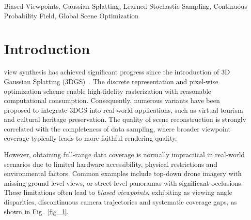 \documentclass[lettersize,journal]{IEEEtran}
\begin{document}
\begin{abstract}
{The target is instantiated by a Continuous Probability Field (CPF), a continuous, globally aggregated probability field that serves as a data-adaptive consistency prior and provides explicit global-consistency regularization for Gaussian relocation and reshaping. The CPF estimates a smooth and multi-view consistent field from global aggregation and observation-gated updates, thus providing less biased regularization and effectively suppressing view-specific overfitting artifacts.
We further leverage a bias-aware random viewpoint batch training strategy to reduce the optimization bias of view-dependent gradients by jointly optimizing uncorrelated viewpoints. 
}
Extensive experiments on three representative biased viewpoint scenarios show that GS-LSS consistently outperforms state-of-the-art Gaussian Splatting baselines, particularly under severe sampling bias.
\end{abstract}

\begin{IEEEkeywords}
Biased Viewpoints, Gaussian Splatting, 
Learned Stochastic Sampling, 
Continuous Probability Field, 
Global Scene Optimization
\end{IEEEkeywords}

\section{Introduction}

 view synthesis has achieved significant progress since the introduction of 3D Gaussian Splatting (3DGS)~\cite{3dgs}. The discrete representation and pixel-wise optimization scheme enable high-fidelity rasterization with reasonable computational consumption. Consequently, numerous variants have been proposed to integrate 3DGS into real-world applications, such as virtual tourism and cultural heritage preservation. 
The quality of scene reconstruction is strongly correlated with the completeness of data sampling, where broader viewpoint coverage typically leads to more faithful rendering quality.

However, obtaining full-range data coverage is normally impractical in real-world scenarios due to limited hardware accessibility, physical restrictions and environmental factors. Common examples include top-down drone imagery with missing ground-level views, or street-level panoramas with significant occlusions. 
These limitations often lead to \emph{biased viewpoints}, exhibiting as viewing angle disparities, discontinuous camera trajectories and systematic coverage gaps, as shown in Fig.~\ref{fig_1}.
\end{document}
